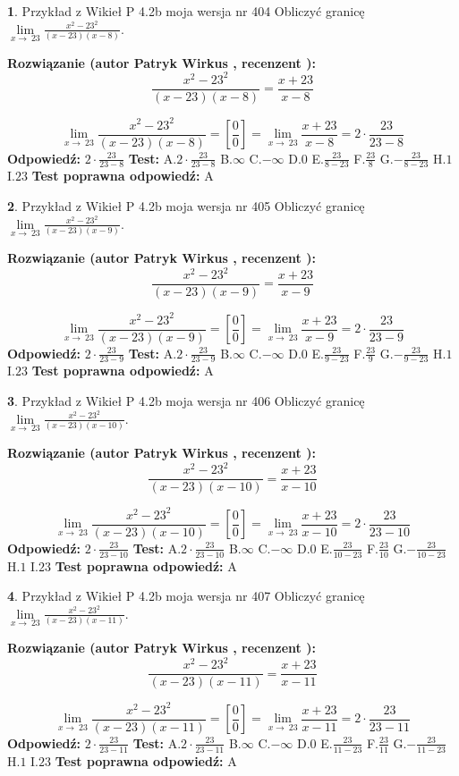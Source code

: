 \documentclass[12pt, a4paper]{article}
\theoremstyle{definition} %
\newtheorem{zad}{}
\newcommand{\zadStart}[1]{\begin{zad}#1\newline}
\newcommand{\zadStop}{\end{zad}}
\newcommand{\rozwStart}[2]{\noindent \textbf{Rozwiązanie (autor #1 , recenzent #2): }\newline}
\newcommand{\rozwStop}{\newline}
\newcommand{\odpStart}{\noindent \textbf{Odpowiedź:}\newline}
\newcommand{\odpStop}{\newline}
\newcommand{\testStart}{\noindent \textbf{Test:}\newline}
\newcommand{\testStop}{\newline}
\newcommand{\kluczStart}{\noindent \textbf{Test poprawna odpowiedź:}\newline}
\newcommand{\kluczStop}{\newline}
\begin{document}
\zadStart{Przykład z Wikieł P 4.2b moja wersja nr 404}
Obliczyć granicę $\lim\limits_{x\to\ 23}\frac{x^{2}-23^{2}}{(x-23)(x-8)}$.
\zadStop
\rozwStart{Patryk Wirkus}{}
$$\frac{x^{2}-23^{2}}{(x-23)(x-8)}=\frac{x+23}{x-8}$$

$$\lim\limits_{x\to\ 23}\frac{x^{2}-23^{2}}{(x-23)(x-8)}=[\frac{0}{0}]=\lim\limits_{x\to\ 23}\frac{x+23}{x-8}=2 \cdot \frac{23}{23-8}$$
\rozwStop
\odpStart
$2 \cdot \frac{23}{23-8}$
\odpStop
\testStart
A.$2 \cdot \frac{23}{23-8}$
B.$\infty$
C.$-\infty$
D.$0$
E.$\frac{23}{8-23}$
F.$\frac{23}{8}$
G.$-\frac{23}{8-23}$
H.$1$
I.$23$
\testStop
\kluczStart
A
\kluczStop



\zadStart{Przykład z Wikieł P 4.2b moja wersja nr 405}
Obliczyć granicę $\lim\limits_{x\to\ 23}\frac{x^{2}-23^{2}}{(x-23)(x-9)}$.
\zadStop
\rozwStart{Patryk Wirkus}{}
$$\frac{x^{2}-23^{2}}{(x-23)(x-9)}=\frac{x+23}{x-9}$$

$$\lim\limits_{x\to\ 23}\frac{x^{2}-23^{2}}{(x-23)(x-9)}=[\frac{0}{0}]=\lim\limits_{x\to\ 23}\frac{x+23}{x-9}=2 \cdot \frac{23}{23-9}$$
\rozwStop
\odpStart
$2 \cdot \frac{23}{23-9}$
\odpStop
\testStart
A.$2 \cdot \frac{23}{23-9}$
B.$\infty$
C.$-\infty$
D.$0$
E.$\frac{23}{9-23}$
F.$\frac{23}{9}$
G.$-\frac{23}{9-23}$
H.$1$
I.$23$
\testStop
\kluczStart
A
\kluczStop



\zadStart{Przykład z Wikieł P 4.2b moja wersja nr 406}
Obliczyć granicę $\lim\limits_{x\to\ 23}\frac{x^{2}-23^{2}}{(x-23)(x-10)}$.
\zadStop
\rozwStart{Patryk Wirkus}{}
$$\frac{x^{2}-23^{2}}{(x-23)(x-10)}=\frac{x+23}{x-10}$$

$$\lim\limits_{x\to\ 23}\frac{x^{2}-23^{2}}{(x-23)(x-10)}=[\frac{0}{0}]=\lim\limits_{x\to\ 23}\frac{x+23}{x-10}=2 \cdot \frac{23}{23-10}$$
\rozwStop
\odpStart
$2 \cdot \frac{23}{23-10}$
\odpStop
\testStart
A.$2 \cdot \frac{23}{23-10}$
B.$\infty$
C.$-\infty$
D.$0$
E.$\frac{23}{10-23}$
F.$\frac{23}{10}$
G.$-\frac{23}{10-23}$
H.$1$
I.$23$
\testStop
\kluczStart
A
\kluczStop



\zadStart{Przykład z Wikieł P 4.2b moja wersja nr 407}
Obliczyć granicę $\lim\limits_{x\to\ 23}\frac{x^{2}-23^{2}}{(x-23)(x-11)}$.
\zadStop
\rozwStart{Patryk Wirkus}{}
$$\frac{x^{2}-23^{2}}{(x-23)(x-11)}=\frac{x+23}{x-11}$$

$$\lim\limits_{x\to\ 23}\frac{x^{2}-23^{2}}{(x-23)(x-11)}=[\frac{0}{0}]=\lim\limits_{x\to\ 23}\frac{x+23}{x-11}=2 \cdot \frac{23}{23-11}$$
\rozwStop
\odpStart
$2 \cdot \frac{23}{23-11}$
\odpStop
\testStart
A.$2 \cdot \frac{23}{23-11}$
B.$\infty$
C.$-\infty$
D.$0$
E.$\frac{23}{11-23}$
F.$\frac{23}{11}$
G.$-\frac{23}{11-23}$
H.$1$
I.$23$
\testStop
\kluczStart
A
\kluczStop
\end{document}
